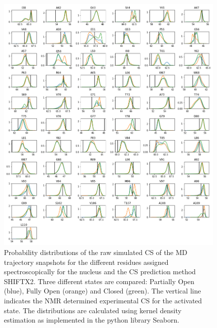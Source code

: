 \documentclass[%
 aip,
 amsmath,amssymb,
 preprint,%
]{revtex4-1}
\newcommand{\ca}{\ce{C_\alpha} }
\begin{document}
\begin{figure}[tbp]
	\includegraphics[width=\textwidth]{figures_SI/hist_sparta_plus_CA.png}
	 \caption{\scriptsize
 Probability distributions of the raw simulated CS of the MD trajectory snapshots for the different residues assigned spectroscopically for the \ca nucleus and the CS prediction method SHIFTX2. Three different states are compared: Partially Open (blue), Fully Open (orange) and Closed (green). The vertical line indicates the NMR determined experimental CS for the activated state. The distributions are calculated using kernel density estimation as implemented in the python library Seaborn. 
}
\label{SI_hist5}
\end{figure}
\end{document}
